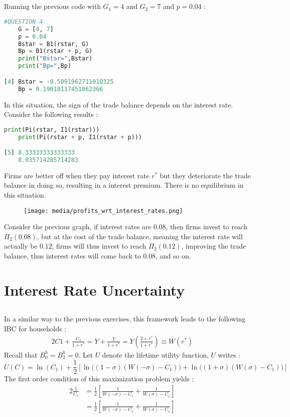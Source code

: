 \documentclass{article}
\begin{document}
\subsection{}
Running the previous code with $G_1 = 4$ and $G_2 = 7$ and $p = 0.04$ :
\begin{lstlisting}[language=Python, label=python_code]
    #QUESTION 4
    G = [4, 7]
    p = 0.04
    Bstar = B1(rstar, G)
    Bp = B1(rstar + p, G)
    print("Bstar=",Bstar)
    print("Bp=",Bp)

[4] Bstar = -0.5091962711010325
    Bp = 0.19018117451062366
\end{lstlisting}
In this situation, the sign of the trade balance depends on the interest rate. Consider the following results :
\begin{lstlisting}[language=Python, label=python_code]
    print(Pi(rstar, I1(rstar)))
    print(Pi(rstar + p, I1(rstar + p)))

[5] 8.33333333333333
    8.035714285714283
\end{lstlisting}
Firms are better off when they pay interest rate $r^*$ but they deteriorate the trade balance in doing so, resulting in a interest premium. There is no equilibrium in this situation.
\begin{figure}[H]
    \centering
    \texttt{[image: media/profits\_wrt\_interest\_rates.png]}
    \label{fig:mon_graphique}
\end{figure}
Consider the previous graph, if interest rates are $0.08$, then firms invest to reach $\Pi_2(0.08)$, but at the cost of the trade balance, meaning the interest rate will actually be $0.12$, firms will thus invest to reach $\Pi_2(0.12)$, improving the trade balance, thus interest rates will come back to $0.08$, and so on.
\newpage




\section{Interest Rate Uncertainty}
\subsection{}
In a similar way to the previous exercises, this framework leads to the following IBC for households :
\begin{alignat}{2}
    C1 + \frac{C_2}{1+r^*}  = Y + \frac{Y}{1+r^*} = Y\left(\frac{2+r^*}{1+r^*}\right) \equiv W(r^*) &\quad
\end{alignat}
Recall that $B_0^h = B_2^h = 0$.\newline
Let $U$ denote the lifetime utility function, $U$ writes : 
\begin{equation}
    U(C)  = \ln (C_1) + \frac{1}{2} \left[ \ln \Big((1-\sigma)(W(-\sigma)-C_1)\Big) + \ln \Big((1+\sigma)(W(\sigma)-C_1)\Big)\right]
\end{equation}
The first order condition of this maximization problem yields :
\begin{alignat}{2}
    \frac{1}{C_1}  &= \frac{1}{2}\left[ \frac{1}{W(-\sigma)-C_1} + \frac{1}{W(\sigma)- C_1}  \right]   &\quad\\
    &= \frac{1}{2}\left[ \frac{1}{W(-\sigma)-C_1} + \frac{1}{W(\sigma)- C_1}  \right]   &\quad
\end{alignat}
\end{document}
